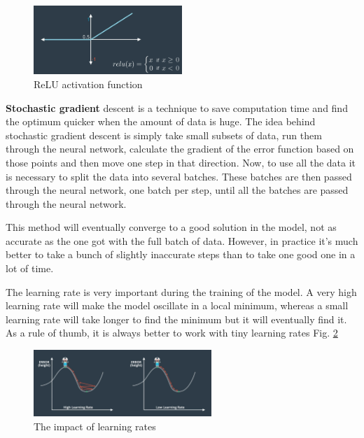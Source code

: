 \documentclass{article}
\begin{document}
\begin{figure}[ht]
    \centering
    \includegraphics[width=0.5\textwidth,height=0.5\textheight,keepaspectratio]{images/relu.png}
    \captionsetup{justification=centering}
    \caption{ReLU activation function}
    \label{fig:f39}
\end{figure}

\textbf{Stochastic gradient} descent is a technique to save computation time and find the optimum quicker when the amount of data is huge. The idea behind stochastic gradient descent is simply take small subsets of data, run them through the neural network, calculate the gradient of the error function based on those points and then move one step in that direction. Now, to use all the data it is necessary to split the data into several batches. These batches are then passed through the neural network, one batch per step, until all the batches are passed through the neural network.

This method will eventually converge to a good solution in the model, not as accurate as the one got with the full batch of data. However, in practice it's much better to take a bunch of slightly inaccurate steps than to take one good one in a lot of time.

The learning rate is very important during the training of the model. A very high learning rate will make the model oscillate in a local minimum, whereas a small learning rate will take longer to find the minimum but it will eventually find it. As a rule of thumb, it is always better to work with tiny learning rates Fig. \ref{fig:f40}

\begin{figure}[ht]
    \centering
    \includegraphics[width=0.6\textwidth,height=0.6\textheight,keepaspectratio]{images/learning_rate.png}
    \captionsetup{justification=centering}
    \caption{The impact of learning rates}
    \label{fig:f40}
\end{figure}
\end{document}
